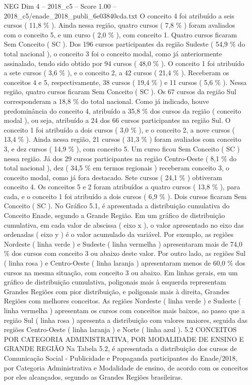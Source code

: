 \begin{textsample}{NEG Dim 4 – 2018\_c5 – Score 1.00 – 2018\_c5/enade\_2018\_publi\_6e03840cda.txt}
O conceito 4 foi atribuído a seis cursos ( 11,8 \% ).
Ainda nessa região, quatro cursos ( 7,8 \% ) foram avaliados com o conceito 5, e um curso ( 2,0 \% ), com conceito 1.
Quatro cursos ficaram Sem Conceito ( SC ).
Dos 196 cursos participantes da região Sudeste ( 54,9 \% do total nacional ), o conceito 3 foi o conceito modal, como já anteriormente assinalado, tendo sido obtido por 94 cursos ( 48,0 \% ).
O conceito 1 foi atribuído a sete cursos ( 3,6 \% ), e o conceito 2, a 42 cursos ( 21,4 \% ).
Receberam os conceitos 4 e 5, respectivamente, 38 cursos ( 19,4 \% ) e 11 cursos ( 5,6 \% ).
Nessa região, quatro cursos ficaram Sem Conceito ( SC ).
Os 67 cursos da região Sul corresponderam a 18,8 \% do total nacional.
Como já indicado, houve predominância do conceito 4, atribuído a 35,8 \% dos cursos da região ( conceito modal ), ou seja, atribuído a 24 dos 66 cursos participantes na região Sul.
O conceito 1 foi atribuído a dois cursos ( 3,0 \% ), e o conceito 2, a nove cursos ( 13,4 \% ).
Ainda nessa região, 21 cursos ( 31,3 \% ) foram avaliados com conceito 3, e dez cursos ( 14,9 \% ), com conceito 5.
Um curso ficou Sem Conceito ( SC ) nessa região.
Já dos 29 cursos participantes na região Centro-Oeste ( 8,1 \% do total nacional ), dez ( 34,5 \% em termos regionais ) receberam conceito 3, o conceito modal, como já fora destacado.
Sete cursos ( 24,1 \% ) obtiveram conceito 4.
Os conceitos 5 e 2 foram atribuídos a quatro cursos ( 13,8 \% ), para cada, e o conceito 1 foi atribuído a dois cursos ( 6,9 \% ).
Dois cursos ficaram Sem Conceito ( SC ).
No Gráfico 5.1, é apresentada a distribuição cumulativa do Conceito Enade, segundo a Grande Região.
Em um gráfico de distribuição cumulativa, em cada valor de abscissa ( eixo x ), o valor apresentado no eixo das ordenadas ( eixo y ) é o valor acumulado da variável.
Por exemplo, as regiões Nordeste ( linha verde ) e Sudeste ( linha vermelha ) apresentaram mais de 74,0 \% dos cursos com conceito 3 ou abaixo deste valor.
Por outro lado, as regiões Sul ( linha rosa ) e Centro-Oeste ( linha laranja ) apresentaram menos de 60,0 \% dos cursos na mesma situação, com conceito 3 ou abaixo.
Em linhas gerais, em um gráfico de distribuição cumulativa, poligonais mais à esquerda representam Grandes Regiões com pior distribuição, e poligonais mais à direita, Grandes Regiões com melhores conceitos.
As regiões Nordeste ( linha verde ) e Sudeste ( linha vermelha ) apresentam os cursos com conceitos mais baixos, ao passo que a região Sul ( linha rosa ) apresenta a distribuição com valores maiores, seguida das regiões Centro-Oeste ( linha laranja ) e Norte ( linha azul ). 5.2 CONCEITOS POR CATEGORIA ADMINISTRATIVA, POR MODALIDADE DE ENSINO E GRANDE REGIÃO Na Tabela 5.2, é apresentada a distribuição dos cursos de Comunicação Social - Publicidade e Propaganda participantes do Enade/2018, por Categoria Administrativa e Modalidade de ensino, de acordo com os conceitos por eles alcançados, segundo as Grandes Regiões brasileiras.

\end{textsample}
